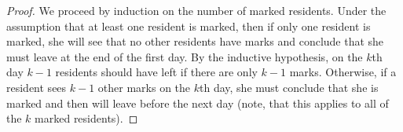 \documentclass[usletter]{article}
\begin{document}
\begin{enumerate}
    \begin{proof}
      We proceed by induction on the number of marked residents. Under the assumption that at least one resident is marked, then if only one resident is marked, she will see that no other residents have marks and conclude that she must leave at the end of the first day. By the inductive hypothesis, on the $k$th day $k - 1$ residents should have left if there are only $k - 1$ marks. Otherwise, if a resident sees $k - 1$ other marks on the $k$th day, she must conclude that she is marked and then will leave before the next day (note, that this applies to all of the $k$ marked residents).
    \end{proof}
\end{enumerate}

\newpage



\end{document}

